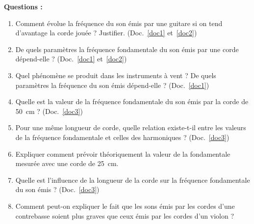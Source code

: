\documentclass[a4paper,12pt,fleqn]{article}%
\begin{document}
\newpage
\textbf{Questions :}
\begin{enumerate}
    \item Comment évolue la fréquence du son émis par une guitare si on tend d'avantage la corde jouée ? Justifier. (Doc.~\ref{doc1} et~\ref{doc2})
    \item De quels paramètres la fréquence fondamentale du son émis par une corde dépend-elle ? (Doc.~\ref{doc1} et~\ref{doc2})
    \item Quel phénomène se produit dans les instruments à vent ? De quels paramètres la fréquence du son émis dépend-elle ? (Doc.~\ref{doc1})
    \item Quelle est la valeur de la fréquence fondamentale du son émis par la corde de \SI{50}{cm} ? (Doc.~\ref{doc3})
    \item Pour une même longueur de corde, quelle relation existe-t-il entre les valeurs de la fréquence fondamentale et celles des harmoniques ? (Doc.~\ref{doc3})
    \item Expliquer comment prévoir théoriquement la valeur de la fondamentale mesurée avec une corde de \SI{25}{cm}.
    \item Quelle est l'influence de la longueur de la corde sur la fréquence fondamentale du son émis ? (Doc.~\ref{doc3})
    \item Comment peut-on expliquer le fait que les sons émis par les cordes d'une contrebasse soient plus graves que ceux émis par les cordes d'un violon ?
\end{enumerate}
\end{document}
